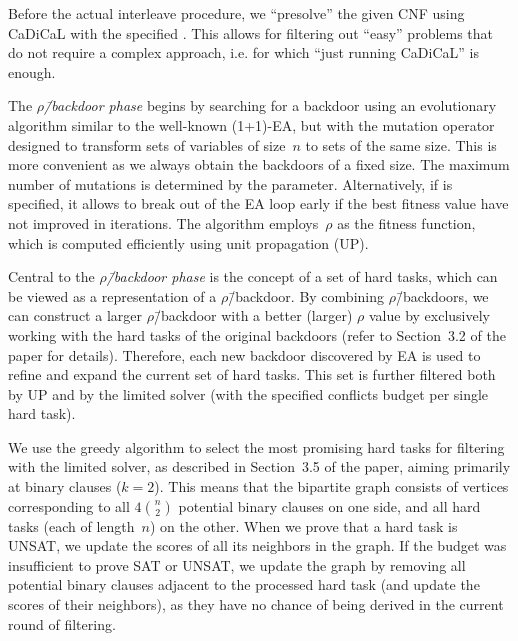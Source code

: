 \documentclass[a4paper]{article}
\begin{document}
Before the actual interleave procedure, we \enquote{presolve} the given CNF using CaDiCaL with the specified \budgetPresolve.
This allows for filtering out \enquote{easy} problems that do not require a complex approach, i.e. for which \enquote{just running CaDiCaL} is enough.

The \emph{$\rho$\=/backdoor phase} begins by searching for a backdoor using an evolutionary algorithm similar to the well-known (1+1)-EA, but with the mutation operator designed to transform sets of variables of size~$n$ to sets of the same size.
This is more convenient as we always obtain the backdoors of a fixed size.
The maximum number of mutations is determined by the \numIters parameter. Alternatively, if \stagnationlimit is specified, it allows to break out of the EA loop early if the best fitness value have not improved in \stagnationlimit iterations.
The algorithm employs~$\rho$ as the fitness function, which is computed efficiently using unit propagation (UP).

Central to the \emph{$\rho$\=/backdoor phase} is the concept of a set of hard tasks, which can be viewed as a representation of a $\rho$\=/backdoor.
By combining $\rho$\=/backdoors, we can construct a larger $\rho$\=/backdoor with a better (larger) $\rho$ value by exclusively working with the hard tasks of the original backdoors (refer to Section~3.2 of the paper for details).
Therefore, each new backdoor discovered by EA is used to refine and expand the current set of hard tasks.
This set is further filtered both by UP and by the limited solver (with the specified conflicts budget \numConflicts per single hard task).

We use the greedy algorithm to select the most promising hard tasks for filtering with the limited solver, as described in Section~3.5 of the paper, aiming primarily at binary clauses ($k = 2$).
This means that the bipartite graph consists of vertices corresponding to all $4 \binom{n}{2}$ potential binary clauses on one side, and all hard tasks (each of length~$n$) on the other.
When we prove that a hard task is UNSAT, we update the scores of all its neighbors in the graph.
If the budget was insufficient to prove SAT or UNSAT, we update the graph by removing all potential binary clauses adjacent to the processed hard task (and update the scores of their neighbors), as they have no chance of being derived in the current round of filtering.
\end{document}
